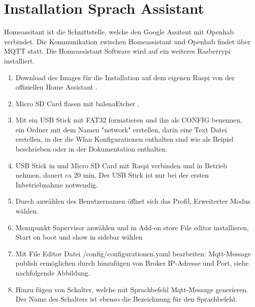 \clearpage
\section{Installation Sprach Assistant} \label{sec:Assistant}
Homeassitant ist die Schnittstelle, welche den Google Assitent mit Openhab verbindet. Die Kommunikation zwischen Homeassistant und Openhab findet über MQTT statt. Die Homeassistant Software wird auf ein weiteres Rasberrypi installiert.

\begin{enumerate}
	\item Download des Images für die Installation auf dem eigenen Raspi von der offiziellen Home Assistant \cite{assistant_installing_nodate}.
\item Micro SD Card flasen mit balenaEtcher \cite{noauthor_balenaetcher_nodate}. 
\item Mit ein USB Stick mit FAT32 formatieren und ihn als CONFIG benennen, ein Ordner mit dem Namen "network" erstellen, darin eine Text Datei erstellen, in der die Wlan Konfigurationen enthalten sind wie als Beipiel \cite{noauthor_home-assistantoperating-system_nodate} beschrieben oder in der Dokumentation enthalten.
\item USB Stick in und Micro SD Card mit Raspi verbinden und in Betrieb nehmen, dauert ca 20 min. Der USB Stick ist nur bei der ersten Inbetriebnahme notwendig.
\item Durch anwählen des Benutzernamen öffnet sich das Profil, Erweiterter Modus wählen.
\item Menupunkt Supervisor anwählen und in Add-on store File editor installieren, Start on boot und show in sidebar wählen
\item Mit File Editor Datei /config/configurationen.yaml bearbeiten: Mqtt-Message publish ermöglichen durch hinzufügen von Broker IP-Adresse und Port, siehe nachfolgende Abbildung.
\item Hinzu fügen von Schalter, welche mit Sprachbefehl Mqtt-Message generieren. Der Name des Schalters ist ebenso die Bezeichnung für den Sprachbefehl.
   \begin{figure}[H]
	\centering

\end{figure}
\end{enumerate}
